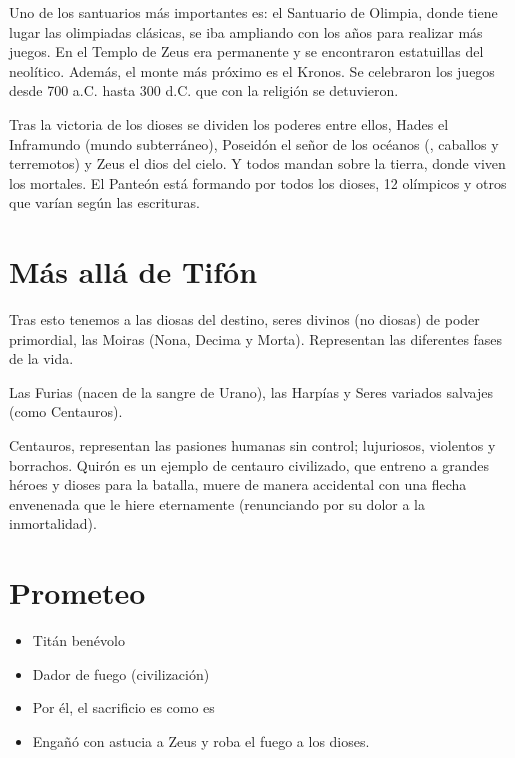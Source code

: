 Uno de los santuarios más importantes es: el Santuario de Olimpia, donde tiene lugar las olimpiadas clásicas, se iba ampliando con los años para realizar más juegos. En el Templo de Zeus era permanente y se encontraron estatuillas del neolítico. Además, el monte más próximo es el Kronos. Se celebraron los juegos desde 700 a.C. hasta 300 d.C. que con la religión se detuvieron.

Tras la victoria de los dioses se dividen los poderes entre ellos, Hades el Inframundo (mundo subterráneo), Poseidón el señor de los océanos (, caballos y terremotos) y Zeus el dios del cielo. Y todos mandan sobre la tierra, donde viven los mortales.
El Panteón está formando por todos los dioses, 12 olímpicos y otros que varían según las escrituras.

\section{Más allá de Tifón}
Tras esto tenemos a las diosas del destino, seres divinos (no diosas) de poder primordial, las Moiras (Nona, Decima y Morta). Representan las diferentes fases de la vida.

Las Furias (nacen de la sangre de Urano), las Harpías y Seres variados salvajes (como Centauros).

Centauros, representan las pasiones humanas sin control; lujuriosos, violentos y borrachos. Quirón es un ejemplo de centauro civilizado, que entreno a grandes héroes y dioses para la batalla, muere de manera accidental con una flecha envenenada que le hiere eternamente (renunciando por su dolor a la inmortalidad).

\section{Prometeo}
\begin{itemize}
	\item Titán benévolo
	\item Dador de fuego (civilización)
	\item Por él, el sacrificio es como es
	\item Engañó con astucia a Zeus y roba el fuego a los dioses.
\end{itemize}

